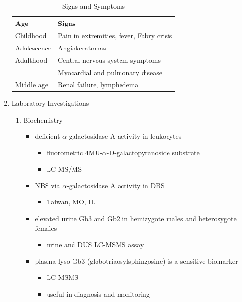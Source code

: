 \documentclass{scrartcl}
\begin{document}
\begin{enumerate}
\begin{table}[htbp]
\caption{\label{tab:org4fe408e}
Signs and Symptoms}
\centering
\begin{tabular}{ll}
Age & Signs\\
\hline
Childhood & Pain in extremities, fever, Fabry crisis \footnotemark\\
Adolescence & Angiokeratomas\\
Adulthood & Central nervous system symptoms\\
 & Myocardial and pulmonary disease\\
Middle age & Renal failure, lymphedema\\
\end{tabular}
\end{table}


\item Laboratory Investigations
\label{sec:org632c16b}
\begin{enumerate}
\item Biochemistry
\label{sec:org4abdccb}
\begin{itemize}
\item deficient \(\alpha\)-galactosidase A activity in leukocytes
\begin{itemize}
\item fluorometric 4MU-\(\alpha\)-D-galactopyranoside substrate
\item LC-MS/MS
\end{itemize}
\item NBS via \(\alpha\)-galactosidase A activity in DBS
\begin{itemize}
\item Taiwan, MO, IL
\end{itemize}
\item elevated urine Gb3 and Gb2 in hemizygote males and heterozygote females
\begin{itemize}
\item urine and DUS LC-MSMS assay
\end{itemize}
\item plasma lyso-Gb3 (globotriaosylsphingosine) is a sensitive biomarker
\begin{itemize}
\item LC-MSMS
\item useful in diagnosis and monitoring
\end{itemize}
\end{itemize}


\end{enumerate}
\end{enumerate}
\end{document}
